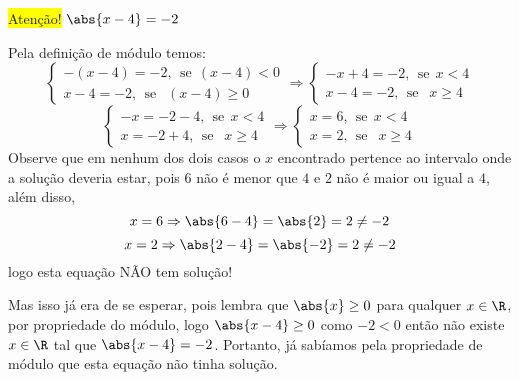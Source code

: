 \begin{exem}
 \colorbox{yellow}{Atenção!} $\abs{x-4}=-2$

     Pela definição de módulo temos:
     \[
    \begin{cases}
      -(x-4)= -2, \ \ \text{se} \ \ (x-4) < 0 \\
        x-4 = -2, \ \ \text{se } \ \ (x-4) \geq 0
     \end{cases}
     \Rightarrow
     \begin{cases}
      -x+4= -2, \ \ \text{se} \ \ x < 4 \\
       x-4= -2, \ \ \text{se } \ \ x \geq 4
     \end{cases}
     \]
     \[
     \begin{cases}
      -x= -2-4, \ \ \text{se} \ \ x < 4 \\
       x= -2+4, \ \ \text{se } \ \ x \geq 4
     \end{cases}
     \Rightarrow
     \begin{cases}
      x= 6, \ \ \text{se} \ \ x < 4 \\
      x= 2, \ \ \text{se } \ \ x \geq 4
     \end{cases}
     \]
 Observe que em nenhum dos dois casos o $x$ encontrado pertence ao intervalo onde a solução deveria estar, pois $6$ não é menor que $4$ e $2$ não é maior ou igual a $4$, além disso,
\begin{equation}
x=6 \Rightarrow \abs{6-4}= \abs{2}= 2 \neq -2
\end{equation}
\begin{equation}
x=2 \Rightarrow \abs{2-4}= \abs{-2}= 2 \neq -2
\end{equation}
 logo esta equação NÃO tem solução!

 Mas isso já era de se esperar, pois lembra que $\abs{x}\geq 0$ para qualquer $x \in \R$, por propriedade do módulo, logo $\abs{x-4} \geq 0$ como $-2< 0$ então não existe $x \in \R$ tal que $\abs{x-4}= -2$. Portanto, já sabíamos pela propriedade de módulo que esta equação não tinha solução.
\end{exem}

